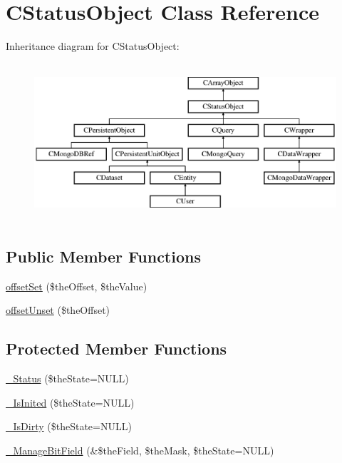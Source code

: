 \hypertarget{class_c_status_object}{\section{C\-Status\-Object Class Reference}
\label{class_c_status_object}
}
Inheritance diagram for C\-Status\-Object\-:\begin{figure}[H]
\begin{center}
\leavevmode
\includegraphics[height=5.874125cm]{class_c_status_object}
\end{center}
\end{figure}
\subsection*{Public Member Functions}
\begin{DoxyCompactItemize}
\item 
\hyperlink{class_c_status_object_a140ef140d4fa1c4a6180e843bd5ec969}{offset\-Set} (\$the\-Offset, \$the\-Value)
\item 
\hyperlink{class_c_status_object_ae733db1bbfffcbe894ea405765ab4150}{offset\-Unset} (\$the\-Offset)
\end{DoxyCompactItemize}
\subsection*{Protected Member Functions}
\begin{DoxyCompactItemize}
\item 
\hyperlink{class_c_status_object_ae856a1a95744086a1e0f09057ca10343}{\-\_\-\-Status} (\$the\-State=N\-U\-L\-L)
\item 
\hyperlink{class_c_status_object_a8429102e4f52f7558649b64f4e673a69}{\-\_\-\-Is\-Inited} (\$the\-State=N\-U\-L\-L)
\item 
\hyperlink{class_c_status_object_a19c4ac94dfe26476e780d77b99744d43}{\-\_\-\-Is\-Dirty} (\$the\-State=N\-U\-L\-L)
\item 
\hyperlink{class_c_status_object_a3e37d72a6462d93bf7ff567f07f78093}{\-\_\-\-Manage\-Bit\-Field} (\&\$the\-Field, \$the\-Mask, \$the\-State=N\-U\-L\-L)
\end{DoxyCompactItemize}
